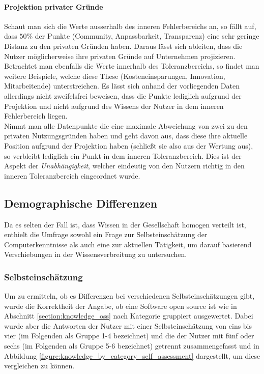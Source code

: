 \documentclass[a4paper]{article}
\begin{document}
                \paragraph{Projektion privater Gründe}
                    Schaut man sich die Werte ausserhalb des inneren Fehlerbereichs an, so fällt auf, dass $50 \%$ der Punkte ({\scriptsize Community, Anpassbarkeit, Transparenz}) eine sehr geringe Distanz zu den privaten Gründen haben. Daraus lässt sich ableiten, dass die Nutzer möglicherweise ihre privaten Gründe auf Unternehmen projizieren.\\
                    Betrachtet man ebenfalls die Werte innerhalb des Toleranzbereichs, so findet man weitere Beispiele, welche diese These ({\scriptsize Kosteneinsparungen, Innovation, Mitarbeitende}) unterstreichen. Es lässt sich anhand der vorliegenden Daten allerdings nicht zweifelsfrei beweisen, dass die Punkte lediglich aufgrund der Projektion und nicht aufgrund des Wissens der Nutzer in dem inneren Fehlerbereich liegen.\\
                    Nimmt man alle Datenpunkte die eine maximale Abweichung von zwei zu den privaten Nutzungsgründen haben und geht davon aus, dass diese ihre aktuelle Position aufgrund der Projektion haben (schließt sie also aus der Wertung aus), so verbleibt lediglich ein Punkt in dem inneren Toleranzbereich. Dies ist der Aspekt der \emph{Unabhängigkeit}, welcher eindeutig von den Nutzern richtig in den inneren Toleranzbereich eingeordnet wurde.
    
        \subsection{Demographische Differenzen}
            Da es selten der Fall ist, dass Wissen in der Gesellschaft homogen verteilt ist, enthielt die Umfrage sowohl ein Frage zur Selbsteinschätzung der Computerkenntnisse als auch eine zur aktuellen Tätigkeit, um darauf basierend Verschiebungen in der Wissensverbreitung zu untersuchen.
            
            \subsubsection{Selbsteinschätzung}
                Um zu ermitteln, ob es Differenzen bei verschiedenen Selbsteinschätzungen gibt, wurde die Korrektheit der Angabe, ob eine Software open source ist wie in Abschnitt \ref{section:knowledge_oss} nach Kategorie gruppiert ausgewertet. Dabei wurde aber die Antworten der Nutzer mit einer Selbsteinschätzung von eins bis vier (im Folgenden als Gruppe 1-4 bezeichnet) und die der Nutzer mit fünf oder sechs (im Folgenden als Gruppe 5-6 bezeichnet) getrennt zusammengefasst und in Abbildung \ref{figure:knowledge_by_category_self_assessment} dargestellt, um diese vergleichen zu können.
                
\end{document}
